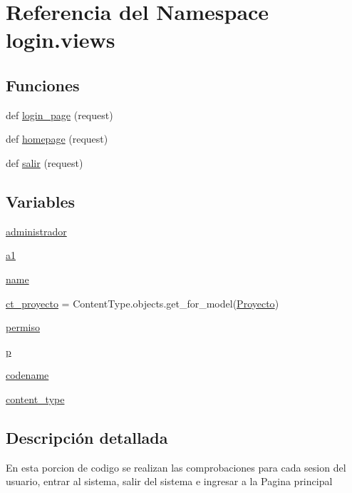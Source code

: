 \hypertarget{namespacelogin_1_1views}{}\section{Referencia del Namespace login.\+views}
\label{namespacelogin_1_1views}
\subsection*{Funciones}
\begin{DoxyCompactItemize}
\item 
def \hyperlink{namespacelogin_1_1views_afeb91ea74ffd5f2354f31bbf94e65218}{login\+\_\+page} (request)
\item 
def \hyperlink{namespacelogin_1_1views_a915497321b9913ec88587f3400060710}{homepage} (request)
\item 
def \hyperlink{namespacelogin_1_1views_a841392ce41f9a1a7ed73c13351df3e04}{salir} (request)
\end{DoxyCompactItemize}
\subsection*{Variables}
\begin{DoxyCompactItemize}
\item 
\hyperlink{namespacelogin_1_1views_aaba2d069f0d21c0a150af80d325008ed}{administrador}
\item 
\hyperlink{namespacelogin_1_1views_ad657bf3c7d1a44c0ed8480dd3a85d3a0}{a1}
\item 
\hyperlink{namespacelogin_1_1views_ab24adc98866e72de9e5f2b9ad4839479}{name}
\item 
\hyperlink{namespacelogin_1_1views_aa576a84ccb04a71c098abd2d73c13426}{ct\+\_\+proyecto} = Content\+Type.\+objects.\+get\+\_\+for\+\_\+model(\hyperlink{classproyectos_1_1models_1_1_proyecto}{Proyecto})
\item 
\hyperlink{namespacelogin_1_1views_aea88f2bb6aebe83405fe86f680e9b7a7}{permiso}
\item 
\hyperlink{namespacelogin_1_1views_a62e13e2b774e30419cb19970d7a58971}{p}
\item 
\hyperlink{namespacelogin_1_1views_aead93f923e331e0e7fc64aa3d6847cc6}{codename}
\item 
\hyperlink{namespacelogin_1_1views_a7bb6fd14fbead19f97d7ba9c9665fef2}{content\+\_\+type}
\end{DoxyCompactItemize}


\subsection{Descripción detallada}
\begin{DoxyVerb}En esta porcion de codigo se realizan las comprobaciones para cada sesion del usuario, entrar
al sistema, salir del sistema e ingresar a la Pagina principal \end{DoxyVerb}
 


